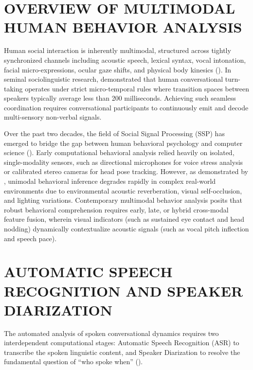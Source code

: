 \documentclass[12pt,a4paper,oneside]{report}
\providecommand{\parencite}[1]{(\cite{#1})}
\providecommand{\textcite}[1]{\cite{#1}}
\begin{document}
\section{OVERVIEW OF MULTIMODAL HUMAN BEHAVIOR ANALYSIS}
Human social interaction is inherently multimodal, structured across tightly synchronized channels including acoustic speech, lexical syntax, vocal intonation, facial micro-expressions, ocular gaze shifts, and physical body kinesics \parencite{vinciarelli2009social}. In seminal sociolinguistic research, \textcite{sacks1974simplest} demonstrated that human conversational turn-taking operates under strict micro-temporal rules where transition spaces between speakers typically average less than 200 milliseconds. Achieving such seamless coordination requires conversational participants to continuously emit and decode multi-sensory non-verbal signals. 

Over the past two decades, the field of Social Signal Processing (SSP) has emerged to bridge the gap between human behavioral psychology and computer science \parencite{vinciarelli2009social}. Early computational behavioral analysis relied heavily on isolated, single-modality sensors, such as directional microphones for voice stress analysis or calibrated stereo cameras for head pose tracking. However, as demonstrated by \textcite{blanco2020meeting}, unimodal behavioral inference degrades rapidly in complex real-world environments due to environmental acoustic reverberation, visual self-occlusion, and lighting variations. Contemporary multimodal behavior analysis posits that robust behavioral comprehension requires early, late, or hybrid cross-modal feature fusion, wherein visual indicators (such as sustained eye contact and head nodding) dynamically contextualize acoustic signals (such as vocal pitch inflection and speech pace).

\section{AUTOMATIC SPEECH RECOGNITION AND SPEAKER DIARIZATION}
The automated analysis of spoken conversational dynamics requires two interdependent computational stages: Automatic Speech Recognition (ASR) to transcribe the spoken linguistic content, and Speaker Diarization to resolve the fundamental question of ``who spoke when'' \parencite{bredin2020pyannote}.
\end{document}
